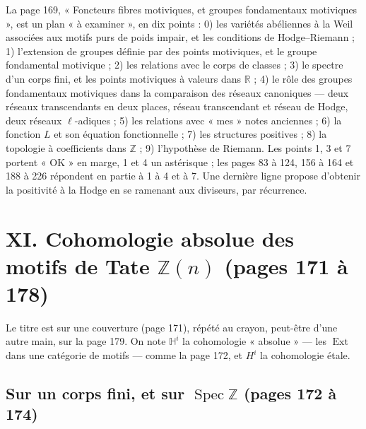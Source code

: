 \documentclass[11pt,a4paper]{article}
\begin{document}
La page 169, « Foncteurs fibres motiviques, et groupes fondamentaux
motiviques », est un plan « à examiner », en dix points : 0) les variétés
abéliennes à la Weil associées aux motifs purs de poids impair, et les
conditions de Hodge--Riemann ; 1) l'extension de groupes définie par des points
motiviques, et le groupe fondamental motivique ; 2) les relations avec le corps
de classes ; 3) le spectre d'un corps fini, et les points motiviques à valeurs
dans $\mathbb{R}$ ; 4) le rôle des groupes fondamentaux motiviques dans la
comparaison des réseaux canoniques --- deux réseaux transcendants en deux places,
réseau transcendant et réseau de Hodge, deux réseaux $\ell$-adiques ; 5) les
relations avec « mes » notes anciennes ; 6) la fonction $L$ et son équation
fonctionnelle ; 7) les structures positives ; 8) la topologie à coefficients dans
$\mathbb{Z}$ ; 9) l'hypothèse de Riemann. Les points 1, 3 et 7 portent « OK » en
marge, 1 et 4 un astérisque ; les pages 83 à 124, 156 à 164 et 188 à 226
répondent en partie à 1 à 4 et à 7. Une dernière ligne propose d'obtenir la
positivité à la Hodge en se ramenant aux diviseurs, par récurrence.

\section*{XI. Cohomologie absolue des motifs de Tate $\mathbb{Z}(n)$ (pages 171 à 178)}

Le titre est sur une couverture (page 171), répété au crayon, peut-être d'une
autre main, sur la page 179. On note $\mathbb{H}^{i}$ la cohomologie « absolue »
--- les $\operatorname{Ext}$ dans une catégorie de motifs --- comme la page 172,
et $H^{i}$ la cohomologie étale.

\subsection*{Sur un corps fini, et sur $\operatorname{Spec} \mathbb{Z}$ (pages 172 à 174)}
\end{document}
